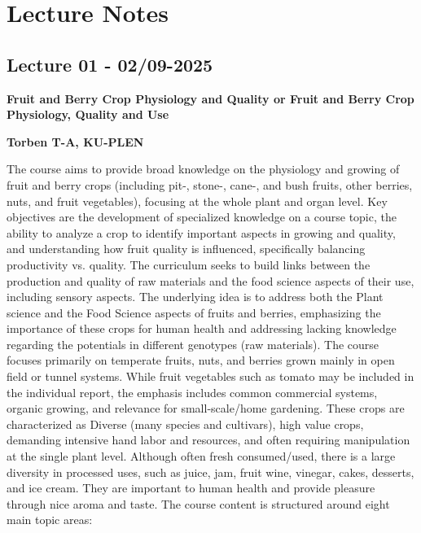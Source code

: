 \setcounter{chapter}{0}
\setcounter{section}{0}
\chapter{Lecture Notes}
\setlength{\headheight}{12.71342pt}
\addtolength{\topmargin}{-0.71342pt}

\section{Lecture 01 - 02/09-2025}
\textbf{Fruit and Berry Crop Physiology and Quality or Fruit and Berry Crop Physiology, Quality and Use}

\textbf{Torben T-A, KU-PLEN}

\vspace{1em}
The course aims to provide broad knowledge on the physiology and growing of fruit and berry crops (including pit-, stone-, cane-, and bush fruits, other berries, nuts, and fruit vegetables), focusing at the whole plant and organ level. Key objectives are the development of specialized knowledge on a course topic, the ability to analyze a crop to identify important aspects in growing and quality, and understanding how fruit quality is influenced, specifically balancing productivity vs. quality. The curriculum seeks to build links between the production and quality of raw materials and the food science aspects of their use, including sensory aspects. The underlying idea is to address both the Plant science and the Food Science aspects of fruits and berries, emphasizing the importance of these crops for human health and addressing lacking knowledge regarding the potentials in different genotypes (raw materials).
The course focuses primarily on temperate fruits, nuts, and berries grown mainly in open field or tunnel systems. While fruit vegetables such as tomato may be included in the individual report, the emphasis includes common commercial systems, organic growing, and relevance for small-scale/home gardening. These crops are characterized as Diverse (many species and cultivars), high value crops, demanding intensive hand labor and resources, and often requiring manipulation at the single plant level. Although often fresh consumed/used, there is a large diversity in processed uses, such as juice, jam, fruit wine, vinegar, cakes, desserts, and ice cream. They are important to human health and provide pleasure through nice aroma and taste.
The course content is structured around eight main topic areas: 


